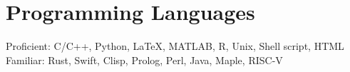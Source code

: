 \section{\sc Programming Languages}
Proficient: C/C++, Python, \LaTeX, MATLAB, R, Unix, Shell script, HTML\\
Familiar: Rust, Swift, Clisp, Prolog, Perl, Java, Maple, RISC-V\\
\endinput